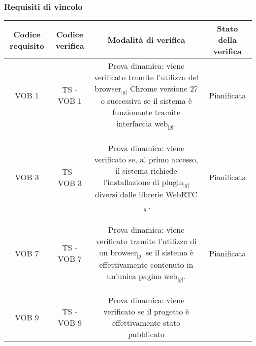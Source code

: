 {	\subsubsection{Requisiti di vincolo}{
		\begin{table}[h!]
			\begin{center}
			\scriptsize
					\begin{minipage}{1\linewidth}
						\begin{tabular}{c c c c}				
						\toprule
							Codice requisito& Codice verifica & Modalità di verifica & Stato della verifica \\
						\midrule
						VOB 1
						&
						TS - VOB 1
						&
						\begin{minipage}{0.55\linewidth}
							Prova dinamica: viene verificato tramite l'utilizzo del browser$_{|g|}$ Chrome versione 27 
							o successiva se il sistema è funzionante tramite interfaccia web$_{|g|}$.
						\end{minipage}	
						&
						Pianificata
						\\
						\\
						\bottomrule
						\\\\
						VOB 3
						&
						TS - VOB 3
						&
						\begin{minipage}{0.55\linewidth}
							Prova dinamica: viene verificato se, al primo accesso, il sistema richiede 
							l'installazione di plugin$_{|g|}$ diversi dalle librerie WebRTC$_{|g|}$.
						\end{minipage}	
						&
						Pianificata
						\\
						\\
						\bottomrule
						\\\\
						VOB 7
						&
						TS - VOB 7
						&
						\begin{minipage}{0.55\linewidth}
							Prova dinamica: viene verificato tramite l'utilizzo di un browser$_{|g|}$ se il sistema è 
							effettivamente	contenuto in un'unica pagina web$_{|g|}$.
						\end{minipage}	
						&
						Pianificata
						\\
						\\
						\bottomrule
						\\\\
						VOB 9
						&
						TS - VOB 9
						&
						\begin{minipage}{0.55\linewidth}
							Prova dinamica: viene verificato se il progetto è effettivamente stato pubblicato 

\end{minipage}
\end{tabular}
\end{minipage}
\end{center}
\end{table}}}
